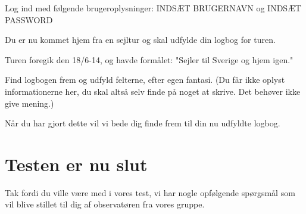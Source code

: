 Log ind med følgende brugeroplysninger: INDSÆT BRUGERNAVN og INDSÆT PASSWORD

Du er nu kommet hjem fra en sejltur og skal udfylde din logbog for turen.

Turen foregik den 18/6-14, og havde formålet: "Sejler til Sverige og hjem igen."

Find logbogen frem og udfyld felterne, efter egen fantasi. (Du får ikke oplyst informationerne her, du skal altså selv finde på noget at skrive. Det behøver ikke give mening.)

Når du har gjort dette vil vi bede dig finde frem til din nu udfyldte logbog. 

\section{Testen er nu slut}


Tak fordi du ville være med i vores test, vi har nogle opfølgende spørgsmål som vil blive stillet til dig af observatøren fra vores gruppe.


\cbend